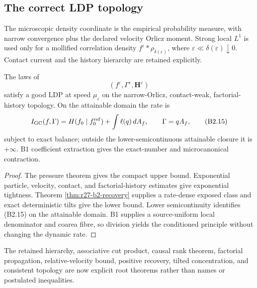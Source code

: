 \subsection{The correct LDP topology}

The microscopic density coordinate is the empirical probability measure,
with narrow convergence plus the declared velocity Orlicz moment.  Strong
local $L^1$ is used only for a mollified correlation density
$f^\varepsilon*\rho_{\delta(\varepsilon)}$, where
$\varepsilon\ll\delta(\varepsilon)\downarrow0$.  Contact current and the
history hierarchy are retained explicitly.

\begin{theorem}
\label{thm:r27-b2-ldp}
The laws of
\[
 (f^\varepsilon,\Gamma^\varepsilon,\mathbf H^\varepsilon)
\]
satisfy a good LDP at speed $\mu_\varepsilon$ on the narrow-Orlicz,
contact-weak, factorial-history topology.  On the attainable domain the rate
is
\[
 I_{\rm GC}(f,\Gamma)
 =H(f_0\mid f_0^{\rm ref})+\int\ell(q)\,dA_f,
 \qquad\Gamma=qA_f,                                      \tag{B2.15}
\]
subject to exact balance; outside the lower-semicontinuous attainable closure
it is $+\infty$.  B1 coefficient extraction gives the exact-number and
microcanonical contraction.
\end{theorem}

\begin{proof}
The pressure theorem gives the compact upper bound.  Exponential particle,
velocity, contact, and factorial-history estimates give exponential
tightness.  Theorem \ref{thm:r27-b2-recovery} supplies a rate-dense exposed
class and exact deterministic tilts give the lower bound.  Lower
semicontinuity identifies (B2.15) on the attainable domain.  B1 supplies a
source-uniform local denominator and coarea fibre, so division yields the
conditioned principle without changing the dynamic rate.
\end{proof}

The retained hierarchy, associative cut product, causal rank theorem,
factorial propagation, relative-velocity bound, positive recovery,
tilted concentration, and consistent topology are now explicit root
theorems rather than names or postulated inequalities.

